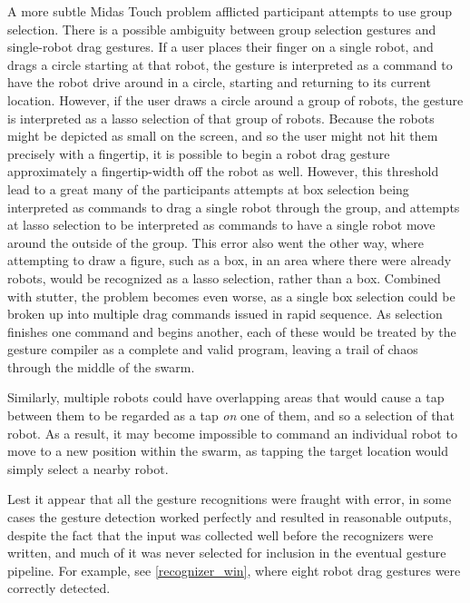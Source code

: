 A more subtle Midas Touch problem afflicted participant attempts to use group selection. 
There is a possible ambiguity between group selection gestures and single-robot drag gestures. 
If a user places their finger on a single robot, and drags a circle starting at that robot, the gesture is interpreted as a command to have the robot drive around in a circle, starting and returning to its current location. 
However, if the user draws a circle around a group of robots, the gesture is interpreted as a lasso selection of that group of robots. 
Because the robots might be depicted as small on the screen, and so the user might not hit them precisely with a fingertip, it is possible to begin a robot drag gesture approximately a fingertip-width off the robot as well. 
However, this threshold lead to a great many of the participants attempts at box selection being interpreted as commands to drag a single robot through the group, and attempts at lasso selection to be interpreted as commands to have a single robot move around the outside of the group. 
This error also went the other way, where attempting to draw a figure, such as a box, in an area where there were already robots, would be recognized as a lasso selection, rather than a box.
Combined with stutter, the problem becomes even worse, as a single box selection could be broken up into multiple drag commands issued in rapid sequence. 
As selection finishes one command and begins another, each of these would be treated by the gesture compiler as a complete and valid program, leaving a trail of chaos through the middle of the swarm. 

Similarly, multiple robots could have overlapping areas that would cause a tap between them to be regarded as a tap \emph{on} one of them, and so a selection of that robot.
As a result, it may become impossible to command an individual robot to move to a new position within the swarm, as tapping the target location would simply select a nearby robot. 

Lest it appear that all the gesture recognitions were fraught with error, in some cases the gesture detection worked perfectly and resulted in reasonable outputs, despite the fact that the input was collected well before the recognizers were written, and much of it was never selected for inclusion in the eventual gesture pipeline. 
For example, see \ref{recognizer_win}, where eight robot drag gestures were correctly detected.
 
